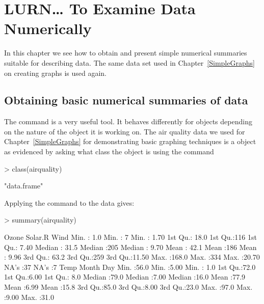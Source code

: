 



 
\chapter{LURN\ldots{} To Examine Data Numerically} 
\label{NumericalEDA} 
 



 
In this chapter we see how to obtain and present simple numerical summaries suitable for describing data. The same data set used in Chapter~\ref{SimpleGraphs} on creating graphs is used again. 
 
\section{Obtaining basic numerical summaries of data} 
 
The  command is a very useful tool. It behaves differently for \R{} objects depending on the nature of the object it is working on. The air quality data we used for Chapter~\ref{SimpleGraphs} for demonstrating basic graphing techniques is a  object as evidenced by asking \R{} what class the object is using the  command 

\begin{Schunk}
\begin{Sinput}
> class(airquality) 
\end{Sinput}
\begin{Soutput}
[1] "data.frame"
\end{Soutput}
\end{Schunk}

 
Applying the  command to the  data gives: 

\begin{Schunk}
\begin{Sinput}
> summary(airquality) 
\end{Sinput}
\begin{Soutput}
     Ozone          Solar.R         Wind      
 Min.   :  1.0   Min.   :  7   Min.   : 1.70  
 1st Qu.: 18.0   1st Qu.:116   1st Qu.: 7.40  
 Median : 31.5   Median :205   Median : 9.70  
 Mean   : 42.1   Mean   :186   Mean   : 9.96  
 3rd Qu.: 63.2   3rd Qu.:259   3rd Qu.:11.50  
 Max.   :168.0   Max.   :334   Max.   :20.70  
 NA's   :37      NA's   :7                    
      Temp          Month           Day      
 Min.   :56.0   Min.   :5.00   Min.   : 1.0  
 1st Qu.:72.0   1st Qu.:6.00   1st Qu.: 8.0  
 Median :79.0   Median :7.00   Median :16.0  
 Mean   :77.9   Mean   :6.99   Mean   :15.8  
 3rd Qu.:85.0   3rd Qu.:8.00   3rd Qu.:23.0  
 Max.   :97.0   Max.   :9.00   Max.   :31.0  
                                             
\end{Soutput}
\end{Schunk}


